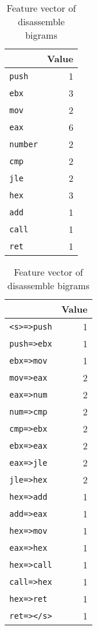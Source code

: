 \begin{table}[!htb]
	\begin{minipage}{.5\linewidth}
		\centering
		
		\caption{Feature vector of disassemble unigrams}
		\label{tab:dis_uni}
		
		\medskip
		
		\begin{tabular}{  lr } 
			\toprule
			\makecell{ Feature }  &  Value \\   
			
			\midrule 
			\texttt{push} & 1	\\
			\texttt{ebx} & 3\\
			\texttt{mov} & 2\\
			\texttt{eax} & 6\\
			\texttt{number} & 2\\
			\texttt{cmp} & 2\\
			\texttt{jle} & 2\\
			\texttt{hex} & 3\\
			\texttt{add} & 1\\
			\texttt{call} & 1\\
			\texttt{ret} & 1\\
			\bottomrule
		\end{tabular}
	\end{minipage}\hfill
	\begin{minipage}{.5\linewidth}
		\centering
		
		\caption{Feature vector of disassemble bigrams}
		\label{tab:dis_big}
		
		\medskip
		
		\begin{tabular}{  lr } 
			\toprule
			\makecell{ Feature }  &  Value \\   
			
			\midrule 
			\texttt{<s>=>push} & 1	\\
			\texttt{push=>ebx} & 1\\
			\texttt{ebx=>mov} & 1\\
			\texttt{mov=>eax} & 2\\
			\texttt{eax=>num} & 2\\
			\texttt{num=>cmp} & 2\\
			\texttt{cmp=>ebx} & 2\\
			\texttt{ebx=>eax} & 2\\
			\texttt{eax=>jle} & 2\\
			\texttt{jle=>hex} & 2\\
			\texttt{hex=>add} & 1\\
			\texttt{add=>eax} & 1\\
			\texttt{hex=>mov} & 1\\
			\texttt{eax=>hex} & 1\\
			\texttt{hex=>call} & 1\\
			\texttt{call=>hex} & 1\\
			\texttt{hex=>ret} & 1\\
			\texttt{ret=></s>} & 1\\
			\bottomrule
		\end{tabular}
	\end{minipage}
\end{table}


